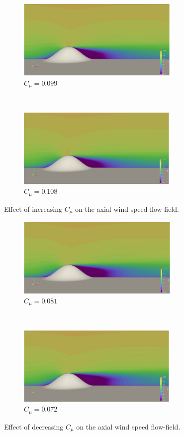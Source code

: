 \documentclass[]{aiaa-tc}%
\begin{document}
\begin{figure}[t!]
    \centering
    \begin{subfigure}[t]{0.5\textwidth}
        \centering
        \includegraphics[height=1.5in]{Ux_099.png}
        \caption{$C_{\mu} = 0.099$}
	\label{f:cmu_099}
    \end{subfigure}%
    ~ 
    \begin{subfigure}[t]{0.5\textwidth}
        \centering
        \includegraphics[height=1.5in]{Ux_108.png}
        \caption{$C_{\mu} = 0.108$}
	\label{f:cmu_108}
    \end{subfigure}
    \caption{Effect of increasing $C_{\mu}$ on the axial wind speed flow-field.}
\end{figure}

\begin{figure}[t!]
    \centering
    \begin{subfigure}[t]{0.5\textwidth}
        \centering
        \includegraphics[height=1.5in]{Ux_081.png}
        \caption{$C_{\mu} = 0.081$}
	\label{f:cmu_081}
    \end{subfigure}%
    ~ 
    \begin{subfigure}[t]{0.5\textwidth}
        \centering
        \includegraphics[height=1.5in]{Ux_072.png}
        \caption{$C_{\mu} = 0.072$}
	\label{f:cmu_072}
    \end{subfigure}
    \caption{Effect of decreasing $C_{\mu}$ on the axial wind speed flow-field.}
\end{figure}
\end{document}

